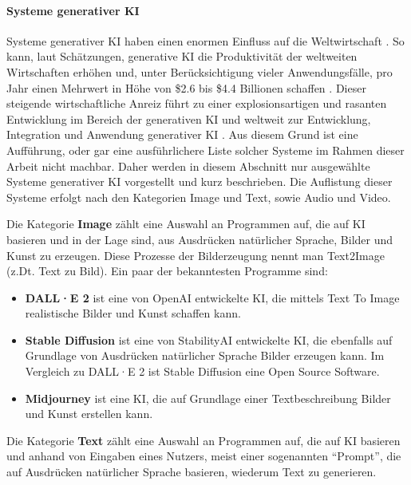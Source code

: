 \paragraph{Systeme generativer KI}
\label{sec2:sota:par:genai-systems}
Systeme generativer KI haben einen enormen Einfluss auf die Weltwirtschaft \cite{mckinsey-economic-genai}.
So kann, laut Schätzungen, generative KI die Produktivität der weltweiten Wirtschaften erhöhen und, unter Berücksichtigung vieler Anwendungsfälle, pro Jahr einen Mehrwert in Höhe von \$2.6 bis \$4.4 Billionen schaffen \cite{mckinsey-economic-genai}.
Dieser steigende wirtschaftliche Anreiz führt zu einer explosionsartigen und rasanten Entwicklung im Bereich der generativen KI und weltweit zur Entwicklung, Integration und Anwendung generativer KI \cite{mckinsey-economic-genai,statista-forecast-ai-market-size}.
Aus diesem Grund ist eine Aufführung, oder gar eine ausführlichere Liste solcher Systeme im Rahmen dieser Arbeit nicht machbar.
Daher werden in diesem Abschnitt nur ausgewählte Systeme generativer KI vorgestellt und kurz beschrieben.
Die Auflistung dieser Systeme erfolgt nach den Kategorien Image und Text, sowie Audio und Video.

Die Kategorie \textbf{Image} zählt eine Auswahl an Programmen auf, die auf KI basieren und in der Lage sind, aus Ausdrücken natürlicher Sprache, Bilder und Kunst zu erzeugen.
Diese Prozesse der Bilderzeugung nennt man Text2Image (z.Dt. Text zu Bild).
Ein paar der bekanntesten Programme sind:

\begin{itemize}
    \item \textbf{DALL·E 2} \cite{dall-e-2} ist eine von OpenAI \cite{openai} entwickelte KI, die mittels Text To Image realistische Bilder und Kunst schaffen kann.
    \item \textbf{Stable Diffusion} \cite{stable-diffusion} ist eine von StabilityAI \cite{stabilityai} entwickelte KI, die ebenfalls auf Grundlage von Ausdrücken natürlicher Sprache Bilder erzeugen kann.
    Im Vergleich zu DALL·E 2 ist Stable Diffusion eine Open Source Software.
    \item \textbf{Midjourney} \cite{midjourney} ist eine KI, die auf Grundlage einer Textbeschreibung Bilder und Kunst erstellen kann. 
\end{itemize}

Die Kategorie \textbf{Text} zählt eine Auswahl an Programmen auf, die auf KI basieren und anhand von Eingaben eines Nutzers, meist einer sogenannten \enquote{Prompt}, die auf Ausdrücken natürlicher Sprache basieren, wiederum Text zu generieren.

